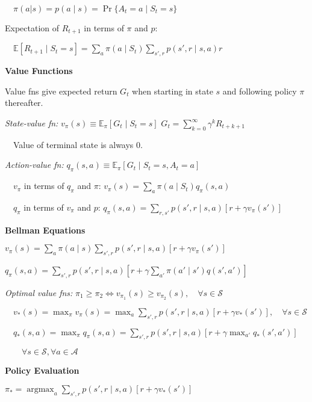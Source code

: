 \documentclass[twocolumn]{article}
\DeclareMathOperator*{\argmax}{argmax}
\begin{document}
$\quad \pi(a|s)= p(a \mid s) = \Pr \{ A_t = a \mid S_t = s \}$

Expectation of $R_{t+1}$ in terms of $\pi$ and $p$:

$\quad \mathbb E[R_{t+1} \mid S_t = s] = \sum_a \pi(a \mid S_t) \sum_{s', r} p(s', r \mid s, a) r$

\dotfill

\textbf{Value Functions}

Value fns give expected return $G_t$ when starting in state $s$ and following policy $\pi$ thereafter.

\textit{State-value fn:} $v_\pi(s) \equiv \mathbb E_\pi [G_t \mid S_t = s]$ \hfill $G_t = \sum_{k=0}^\infty \gamma^k R_{t+k+1}$

$\quad$Value of terminal state is always 0.

\textit{Action-value fn:} $q_\pi(s, a) \equiv \mathbb E_\pi [G_t \mid S_t = s, A_t = a]$

$\quad v_\pi$ in terms of $q_\pi$ and $\pi$: $v_\pi (s) = \sum_a \pi(a \mid S_t) q_\pi(s, a)$

$\quad q_\pi$ in terms of $v_\pi$ and $p$: $q_\pi(s, a) = \sum_{r, s'} p(s', r \mid s, a) [r + \gamma v_\pi(s')]$


\cleardoublepage


\textbf{Bellman Equations}

$v_\pi(s) = \sum_a \pi(a \mid s) \sum_{s', r} p(s', r \mid s, a) [r + \gamma v_\pi(s')]$

$q_\pi(s,a) = \sum_{s', r} p(s',r \mid s,a) \left[ r + \gamma \sum_{a'} \pi(a' \mid s') q(s', a') \right]$

\textit{Optimal value fns:} $\pi_1 \geq \pi_2 \iff v_{\pi_1}(s) \geq v_{\pi_2}(s), \quad \forall s \in \mathcal S$

$\quad v_*(s) = \max_\pi v_{\pi}(s) = \max_a \sum_{s', r} p(s', r \mid s, a) [r + \gamma v_*(s')], \quad \forall s \in \mathcal S$

$\quad q_*(s, a) = \max_{\pi} q_\pi(s,a) = \sum_{s', r} p(s', r \mid s, a) [ r + \gamma \max_{a'} q_*(s', a')]$

$\quad \quad \forall s \in \mathcal S, \forall a \in \mathcal A$

\vspace{-.5em}
\dotfill

\textbf{Policy Evaluation}

$\pi_* = \argmax_a \sum_{s', r} p(s',r \mid s, a)[r + \gamma v_*(s')]$
\end{document}
